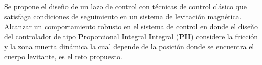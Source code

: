 \begin{sloppypar}
    Se propone el diseño de un lazo de control con técnicas de control clásico que satisfaga condiciones de seguimiento en un sistema de levitación magnética. Alcanzar un comportamiento robusto
    en el sistema de control en donde el diseño del controlador de tipo \textbf{P}roporcional \textbf{I}ntegral \textbf{I}ntegral (\textbf{PII}) considere la fricción y la zona muerta dinámica
    la cual depende de la posición donde se encuentra el cuerpo levitante, es el reto propuesto.
\end{sloppypar}